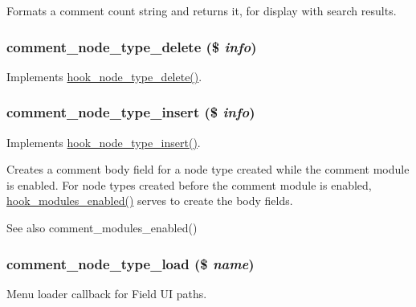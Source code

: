 Formats a comment count string and returns it, for display with search results. \hypertarget{comment_8module_a91ec97379602d78b57140003c9d380f4}{
\subsubsection[{comment\_\-node\_\-type\_\-delete}]{\setlength{\rightskip}{0pt plus 5cm}comment\_\-node\_\-type\_\-delete (\$ {\em info})}}
\label{comment_8module_a91ec97379602d78b57140003c9d380f4}
Implements \hyperlink{group__hooks_ga35ae5b1a494322b02d03ae00a98ac77b}{hook\_\-node\_\-type\_\-delete()}. \hypertarget{comment_8module_a7a86654032864f38a6c672c7fd0a15d9}{
\subsubsection[{comment\_\-node\_\-type\_\-insert}]{\setlength{\rightskip}{0pt plus 5cm}comment\_\-node\_\-type\_\-insert (\$ {\em info})}}
\label{comment_8module_a7a86654032864f38a6c672c7fd0a15d9}
Implements \hyperlink{group__hooks_ga8941b418846350a7edbd67ac388a5dfb}{hook\_\-node\_\-type\_\-insert()}.

Creates a comment body field for a node type created while the comment module is enabled. For node types created before the comment module is enabled, \hyperlink{group__hooks_ga0eb7c67333e0f40b4a46c0dc4c4a92f3}{hook\_\-modules\_\-enabled()} serves to create the body fields.

\begin{DoxySeeAlso}{See also}
comment\_\-modules\_\-enabled() 
\end{DoxySeeAlso}
\hypertarget{comment_8module_a05a5d2b61a4656fba57a93489c4bcd3b}{
\subsubsection[{comment\_\-node\_\-type\_\-load}]{\setlength{\rightskip}{0pt plus 5cm}comment\_\-node\_\-type\_\-load (\$ {\em name})}}
\label{comment_8module_a05a5d2b61a4656fba57a93489c4bcd3b}
Menu loader callback for Field UI paths.

